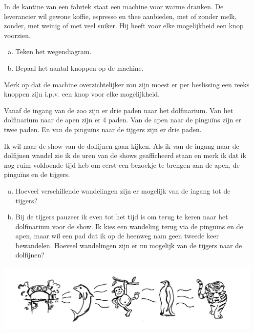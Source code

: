 \documentclass[12pt,a4paper,twoside]{article}
\begin{document}
\begin{oefening}
In de kantine van een fabriek staat een machine voor warme dranken. De leverancier wil gewone koffie, espresso en thee aanbieden, met of zonder melk, zonder, met weinig of met veel suiker. Hij heeft voor elke mogelijkheid een knop voorzien.
\begin{enumerate}[(a)]
\item Teken het wegendiagram.
\item Bepaal het aantal knoppen op de machine.
\end{enumerate}
Merk op dat de machine overzichtelijker zou zijn moest er per beslissing een reeks knoppen zijn i.p.v. een knop voor elke mogelijkheid.
\end{oefening}

\begin{oefening}
Vanaf de ingang van de zoo zijn er drie paden naar het dolfinarium. Van het dolfinarium naar de apen zijn er 4 paden. Van de apen naar de pinguïns zijn er twee paden. En van de pinguïns naar de tijgers zijn er drie paden.

Ik wil naar de show van de dolfijnen gaan kijken. Als ik van de ingang naar de dolfijnen wandel zie ik de uren van de shows geafficheerd staan en merk ik dat ik nog ruim voldoende tijd heb om eerst een bezoekje te brengen aan de apen, de pinguïns en de tijgers.

\begin{enumerate}[(a)]
  \item Hoeveel verschillende wandelingen zijn er mogelijk van de ingang tot de tijgers?
  \item Bij de tijgers pauzeer ik even tot het tijd is om terug te keren naar het dolfinarium voor de show. Ik kies een wandeling terug via de pinguïns en de apen, maar wil een pad dat ik op de heenweg nam geen tweede keer bewandelen. Hoeveel wandelingen zijn er nu mogelijk van de tijgers naar de dolfijnen?
\end{enumerate}
\begin{center}
  \includegraphics[width=\textwidth]{zoodieren}
\end{center}
\end{oefening}
\end{document}
